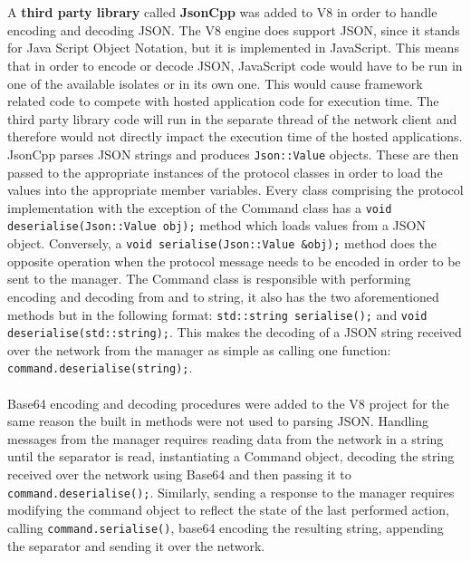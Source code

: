 \documentclass{l4proj}
\begin{document}
\\\\
\hspace*{3em} A \textbf{third party library} called \textbf{JsonCpp} was added to V8 in order to handle encoding and decoding JSON. The V8 engine does support JSON, since it stands for Java Script Object Notation, but it is implemented in JavaScript. This means that in order to encode or decode JSON, JavaScript code would have to be run in one of the available isolates or in its own one. This would cause framework related code to compete with hosted application code for execution time. The third party library code will run in the separate thread of the network client and therefore would not directly impact the execution time of the hosted applications. JsonCpp parses JSON strings and produces \texttt{Json::Value} objects. These are then passed to the appropriate instances of the protocol classes in order to load the values into the appropriate member variables. Every class comprising the protocol implementation with the exception of the Command class has a \texttt{void deserialise(Json::Value obj);} method which loads values from a JSON object. Conversely, a \texttt{void serialise(Json::Value \&obj);} method does the opposite operation when the protocol message needs to be encoded in order to be sent to the manager. The Command class is responsible with performing encoding and decoding from and to string, it also has the two aforementioned methods but in the following format: \texttt{std::string serialise();} and \texttt{void deserialise(std::string);}. This makes the decoding of a JSON string received over the network from the manager as simple as calling one function: \texttt{command.deserialise(string);}.
\\\\
\hspace*{3em} Base64 encoding and decoding procedures were added to the V8 project for the same reason the built in methods were not used to parsing JSON. Handling messages from the manager requires reading data from the network in a string until the separator is read, instantiating a Command object, decoding the string received over the network using Base64 and then passing it to \texttt{command.deserialise();}. Similarly, sending a response to the manager requires modifying the command object to reflect the state of the last performed action, calling \texttt{command.serialise()}, base64 encoding the resulting string, appending the separator and sending it over the network.
\end{document}

